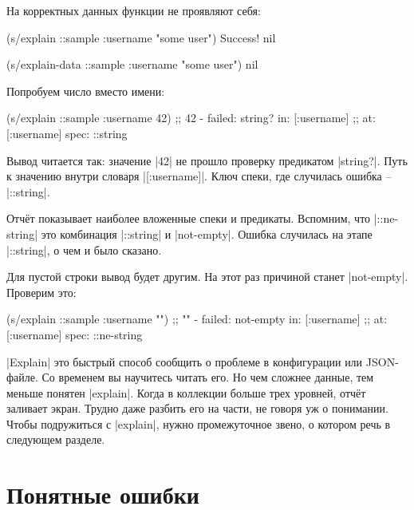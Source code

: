 \noindent
На корректных данных функции не проявляют себя:

\begin{english}
  \begin{clojure}
(s/explain ::sample {:username "some user"})
Success!
nil

(s/explain-data ::sample {:username "some user"})
nil
  \end{clojure}
\end{english}

\noindent
Попробуем число вместо имени:

\begin{english}
  \begin{clojure}
(s/explain ::sample {:username 42})
;; 42 - failed: string? in: [:username]
;; at: [:username] spec: ::string
  \end{clojure}
\end{english}

Вывод читается так: значение \spverb|42| не прошло проверку предикатом
\spverb|string?|. Путь к значению внутри словаря \spverb|[:username]|. Ключ
спеки, где случилась ошибка -- \spverb|::string|.

Отч\"{е}т показывает наиболее вложенные спеки и предикаты. Вспомним, что
\spverb|::ne-string| это комбинация \spverb|::string| и
\spverb|not-empty|. Ошибка случилась на этапе \spverb|::string|, о чем и было
сказано.

Для пустой строки вывод будет другим. На этот раз причиной станет
\spverb|not-empty|. Проверим это:

\begin{english}
  \begin{clojure}
(s/explain ::sample {:username ""})
;; "" - failed: not-empty in: [:username]
;; at: [:username] spec: ::ne-string
  \end{clojure}
\end{english}

\spverb|Explain| это быстрый способ сообщить о проблеме в конфигурации или
JSON-файле. Со временем вы научитесь читать его. Но чем сложнее данные, тем
меньше понятен \spverb|explain|. Когда в коллекции больше трех уровней,
отч\"{е}т заливает экран. Трудно даже разбить его на части, не говоря уж о
понимании. Чтобы подружиться с \spverb|explain|, нужно промежуточное звено, о
котором речь в следующем разделе.

\section{Понятные ошибки}

